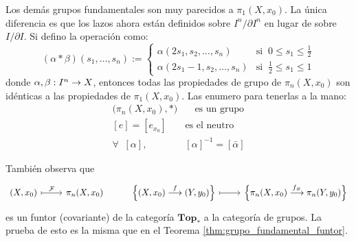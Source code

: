 \documentclass[../../topologia_algebraica]{subfiles}
\begin{document}
Los dem\'as grupos fundamentales son muy parecidos a $\pi_1(X,x_0)$. La \'unica diferencia es que
los lazos ahora est\'an definidos sobre $I^n/\partial I^n$ en lugar de sobre $I/\partial I$.
Si defino la operaci\'on como:
\[
  (\alpha*\beta)(s_1,\ldots,s_n):=
  \begin{cases}
    \alpha(2s_1,s_2,\ldots,s_n) & \text{si}\;\; 0\leq s_1\leq\frac{1}{2} \\
    \alpha(2s_1-1,s_2,\ldots,s_n) & \text{si}\;\; \frac{1}{2}\leq s_1 \leq 1
  \end{cases}
\]
donde $\alpha,\beta:I^n\rightarrow X$, entonces todas las propiedades de grupo de $\pi_n(X,x_0)$
son id\'enticas a las propiedades de $\pi_1(X,x_0)$. Las enumero para tenerlas a la mano:
\begin{align*}%
  \big(\pi_n(X,x_0),*\big ) &  \quad\text{es un grupo} \\ %
  [e]=[e_{x_0}]\quad & \text{es el neutro} \\  %
  \forall\;\; [\alpha],\quad &  [\alpha]^{-1}=[\bar{\alpha}]
\end{align*}%

Tambi\'en observa que 
  \[
    \begin{tikzcd}
      (X,x_0) \arrow[r,mapsto,"\Ff"] & \pi_n(X,x_0) &
      \Big\{ (X,x_0)\morf{f}(Y,y_0) \Big\} \arrow[r,mapsto] &
      \Big\{ \pi_n(X,x_0)\morf{f_{\#}}\pi_n(Y,y_0) \Big\}
    \end{tikzcd}
  \]
  es un funtor (covariante) de la categor\'ia $\mathbf{Top}_*$ a la categor\'ia de grupos. La
  prueba de esto es la misma que en el Teorema \ref{thm:grupo_fundamental_funtor}.
\end{document}
